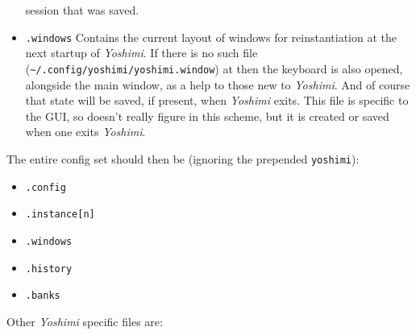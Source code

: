 \begin{itemize}
         session that was saved.
      \item \texttt{.windows}
         Contains the current layout of windows for reinstantiation at the next
         startup of \textsl{Yoshimi}.
         If there is no such file
         (\texttt{\textasciitilde/.config/yoshimi/yoshimi.window}) at then the
         keyboard is also opened, alongside the main window, as a help to those
         new to \textsl{Yoshimi}.
         And of course that state will be saved, if present, when
         \textsl{Yoshimi} exits.
         This file is specific to the GUI, so doesn't really figure in this
         scheme, but it is created or saved when one exits \textsl{Yoshimi}.
   \end{itemize}
   The entire config set should then be (ignoring the prepended
   \texttt{yoshimi}):

   \begin{itemize}
      \item \texttt{.config}
      \item \texttt{.instance[n]}
      \item \texttt{.windows}
      \item \texttt{.history}
      \item \texttt{.banks}
   \end{itemize}

   Other \textsl{Yoshimi} specific files are:


